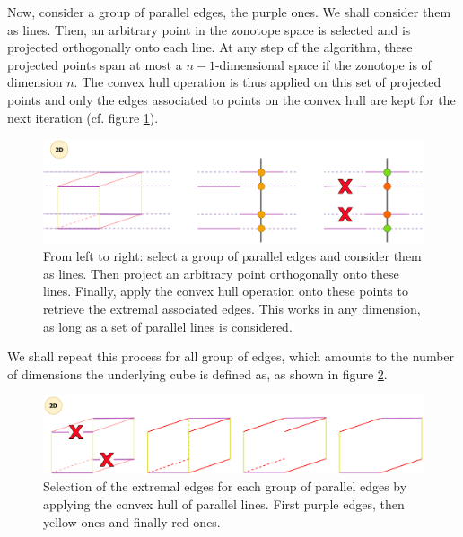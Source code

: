 Now, consider a group of parallel edges, the purple ones. We shall consider them as lines. Then, an arbitrary point in the zonotope space is selected and is projected orthogonally onto each line. At any step of the algorithm, these projected points span at most a $n-1$-dimensional space if the zonotope is of dimension $n$. The convex hull operation is thus applied on this set of projected points and only the edges associated to points on the convex hull are kept for the next iteration (cf. figure \ref{fig:convex_hull_lines}).
\begin{figure}[!htb]
    \captionsetup{justification=centering}
    
    \centering
    \includegraphics[trim={0 0 0 0},clip,width=1\linewidth]{img/chapter_2/zonotope_convex_hull_lines.pdf}

    \caption{From left to right: select a group of parallel edges and consider them as lines. Then project an arbitrary point orthogonally onto these lines. Finally, apply the convex hull operation onto these points to retrieve the extremal associated edges. This works in any dimension, as long as a set of parallel lines is considered.}
    \label{fig:convex_hull_lines}
\end{figure}

We shall repeat this process for all group of edges, which amounts to the number of dimensions the underlying cube is defined as, as shown in figure \ref{fig:convex_hull_lines_repeat_groups}.

\begin{figure}[!htb]
    \captionsetup{justification=centering}
    
    \centering
    \includegraphics[trim={0 0 0 0},clip,width=1\linewidth]{img/chapter_2/zonotope_edge_elimination_repeat.pdf}

    \caption{Selection of the extremal edges for each group of parallel edges by applying the convex hull of parallel lines. First purple edges, then yellow ones and finally red ones.}
    \label{fig:convex_hull_lines_repeat_groups}
\end{figure}

